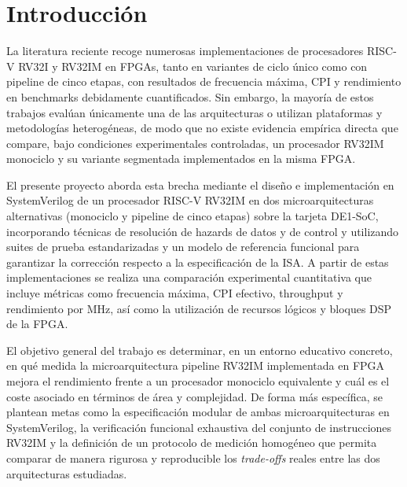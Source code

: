 \section{Introducción}
\label{sec:introduccion}


La literatura reciente recoge numerosas implementaciones de procesadores RISC-V RV32I y RV32IM en FPGAs, tanto en variantes de ciclo único como con pipeline de cinco etapas, con resultados de frecuencia máxima, CPI y rendimiento en benchmarks debidamente cuantificados. Sin embargo, la mayoría de estos trabajos evalúan únicamente una de las arquitecturas o utilizan plataformas y metodologías heterogéneas, de modo que no existe evidencia empírica directa que compare, bajo condiciones experimentales controladas, un procesador RV32IM monociclo y su variante segmentada implementados en la misma FPGA.

El presente proyecto aborda esta brecha mediante el diseño e implementación en SystemVerilog de un procesador RISC-V RV32IM en dos microarquitecturas alternativas (monociclo y pipeline de cinco etapas) sobre la tarjeta DE1-SoC, incorporando técnicas de resolución de hazards de datos y de control y utilizando suites de prueba estandarizadas y un modelo de referencia funcional para garantizar la corrección respecto a la especificación de la ISA. A partir de estas implementaciones se realiza una comparación experimental cuantitativa que incluye métricas como frecuencia máxima, CPI efectivo, throughput y rendimiento por MHz, así como la utilización de recursos lógicos y bloques DSP de la FPGA.

El objetivo general del trabajo es determinar, en un entorno educativo concreto, en qué medida la microarquitectura pipeline RV32IM implementada en FPGA mejora el rendimiento frente a un procesador monociclo equivalente y cuál es el coste asociado en términos de área y complejidad. De forma más específica, se plantean metas como la especificación modular de ambas microarquitecturas en SystemVerilog, la verificación funcional exhaustiva del conjunto de instrucciones RV32IM y la definición de un protocolo de medición homogéneo que permita comparar de manera rigurosa y reproducible los \emph{trade-offs} reales entre las dos arquitecturas estudiadas.


